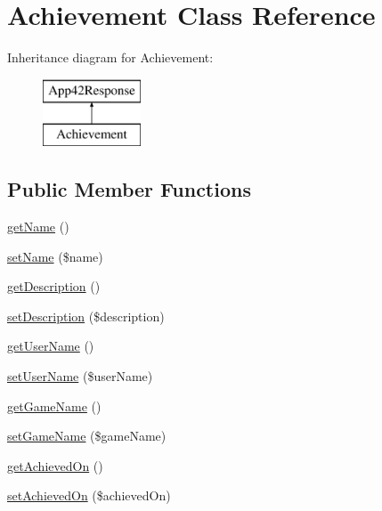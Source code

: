 \hypertarget{class_achievement}{\section{Achievement Class Reference}
\label{class_achievement}
}
Inheritance diagram for Achievement\+:\begin{figure}[H]
\begin{center}
\leavevmode
\includegraphics[height=2.000000cm]{class_achievement}
\end{center}
\end{figure}
\subsection*{Public Member Functions}
\begin{DoxyCompactItemize}
\item 
\hyperlink{class_achievement_a3d0963e68bb313b163a73f2803c64600}{get\+Name} ()
\item 
\hyperlink{class_achievement_a2fe666694997d047711d7653eca2f132}{set\+Name} (\$name)
\item 
\hyperlink{class_achievement_a2e7bb35c71bf1824456ceb944cb7a845}{get\+Description} ()
\item 
\hyperlink{class_achievement_a31fad3e39336ea079ea758e051866627}{set\+Description} (\$description)
\item 
\hyperlink{class_achievement_aafd6d1ef27e6acc5833aba4012e5ee77}{get\+User\+Name} ()
\item 
\hyperlink{class_achievement_a20f0087f72763b84d2992ba6ffee2fb2}{set\+User\+Name} (\$user\+Name)
\item 
\hyperlink{class_achievement_aa001e9c5900be370cd4990e5d8abc6c1}{get\+Game\+Name} ()
\item 
\hyperlink{class_achievement_a159ff188f56ba9f18b3eaa41018f4cc1}{set\+Game\+Name} (\$game\+Name)
\item 
\hyperlink{class_achievement_a9744e6271be69e29db36320426ffddbe}{get\+Achieved\+On} ()
\item 
\hyperlink{class_achievement_aee91490f7a203de4072bda3f2e4a2d43}{set\+Achieved\+On} (\$achieved\+On)
\end{DoxyCompactItemize}
